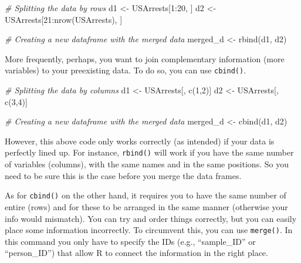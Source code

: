 \documentclass[
]{book}
\newenvironment{Shaded}{\begin{snugshade}}{\end{snugshade}}
\newcommand{\CommentTok}[1]{\textcolor[rgb]{0.56,0.35,0.01}{\textit{#1}}}
\newcommand{\DecValTok}[1]{\textcolor[rgb]{0.00,0.00,0.81}{#1}}
\newcommand{\FunctionTok}[1]{\textcolor[rgb]{0.00,0.00,0.00}{#1}}
\newcommand{\NormalTok}[1]{#1}
\newcommand{\OtherTok}[1]{\textcolor[rgb]{0.56,0.35,0.01}{#1}}
\newcommand{\SpecialCharTok}[1]{\textcolor[rgb]{0.00,0.00,0.00}{#1}}
\begin{document}
\begin{Shaded}
\begin{Highlighting}[]
\CommentTok{\# Splitting the data by rows}
\NormalTok{d1 }\OtherTok{\textless{}{-}}\NormalTok{ USArrests[}\DecValTok{1}\SpecialCharTok{:}\DecValTok{20}\NormalTok{, ]}
\NormalTok{d2 }\OtherTok{\textless{}{-}}\NormalTok{ USArrests[}\DecValTok{21}\SpecialCharTok{:}\FunctionTok{nrow}\NormalTok{(USArrests), ]}

\CommentTok{\# Creating a new dataframe with the merged data}
\NormalTok{merged\_d }\OtherTok{\textless{}{-}} \FunctionTok{rbind}\NormalTok{(d1, d2)}
\end{Highlighting}
\end{Shaded}

More frequently, perhaps, you want to join complementary information (more variables) to your preexisting data.
To do so, you can use \texttt{cbind()}.

\begin{Shaded}
\begin{Highlighting}[]
\CommentTok{\# Splitting the data by columns}
\NormalTok{d1 }\OtherTok{\textless{}{-}}\NormalTok{ USArrests[, }\FunctionTok{c}\NormalTok{(}\DecValTok{1}\NormalTok{,}\DecValTok{2}\NormalTok{)]}
\NormalTok{d2 }\OtherTok{\textless{}{-}}\NormalTok{ USArrests[, }\FunctionTok{c}\NormalTok{(}\DecValTok{3}\NormalTok{,}\DecValTok{4}\NormalTok{)]}

\CommentTok{\# Creating a new dataframe with the merged data}
\NormalTok{merged\_d }\OtherTok{\textless{}{-}} \FunctionTok{cbind}\NormalTok{(d1, d2)}
\end{Highlighting}
\end{Shaded}

However, this above code only works correctly (as intended) if your data is perfectly lined up.
For instance, \texttt{rbind()} will work if you have the same number of variables (columns), with the same names and in the same positions.
So you need to be sure this is the case before you merge the data frames.

As for \texttt{cbind()} on the other hand, it requires you to have the same number of entire (rows) and for these to be arranged in the same manner (otherwise your info would mismatch).
You can try and order things correctly, but you can easily place some information incorrectly.
To circumvent this, you can use \texttt{merge()}.
In this command you only have to specify the IDs (e.g., ``sample\_ID'' or ``person\_ID'') that allow R to connect the information in the right place.
\end{document}
